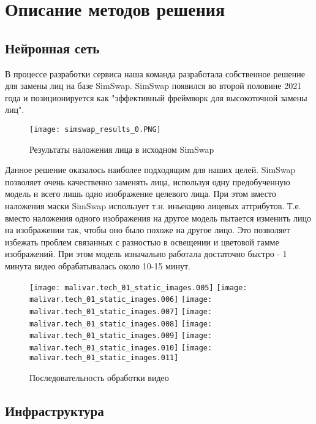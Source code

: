 
\section{Описание методов решения}

\subsection{Нейронная сеть}

В процессе разработки сервиса наша команда разработала собственное решение для замены лиц на базе SimSwap\cite{DBLP:conf/mm/ChenCNG20}. SimSwap\cite{DBLP:conf/mm/ChenCNG20} появился во второй половине 2021 года и позиционируется как "эффективный фреймворк для высокоточной замены лиц".

\begin{figure}[H]
	\centering
	\texttt{[image: simswap\_results\_0.PNG]}
	\caption{Результаты наложения лица в исходном SimSwap} \label{simswap_results}
\end{figure}

Данное решение оказалось наиболее подходящим для наших целей. SimSwap позволяет очень качественно заменять лица, используя одну предобученную модель и всего лишь одно изображение целевого лица. При этом вместо наложения маски SimSwap использует т.н. иньекцию лицевых аттрибутов. Т.е. вместо наложения одного изображения на другое модель пытается изменить лицо на изображении так, чтобы оно было похоже на другое лицо. Это позволяет избежать проблем связанных с разностью в освещении и цветовой гамме изображений. При этом модель изначально работала достаточно быстро - 1 минута видео обрабатывалась около 10-15 минут.

\noindent

\begin{figure}
	\texttt{[image: malivar.tech\_01\_static\_images.005]}
	\texttt{[image: malivar.tech\_01\_static\_images.006]}
	\texttt{[image: malivar.tech\_01\_static\_images.007]}
	\texttt{[image: malivar.tech\_01\_static\_images.008]}
	\texttt{[image: malivar.tech\_01\_static\_images.009]}
	\texttt{[image: malivar.tech\_01\_static\_images.010]}
	\texttt{[image: malivar.tech\_01\_static\_images.011]}
	\caption{Последовательность обработки видео}
\end{figure}

\subsection{Инфраструктура}

